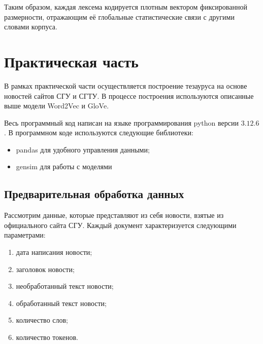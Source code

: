 \documentclass[coursework]{SCWorks}
\begin{document}
Таким образом, каждая лексема кодируется плотным вектором фиксированной размерности, отражающим её глобальные статистические связи с другими словами корпуса.






\section{Практическая часть}
В рамках практической части осуществляется построение тезауруса на основе новостей сайтов СГУ и СГТУ. В процессе построения используются описанные выше модели Word2Vec и GloVe.

Весь программный код написан на языке программирования python версии $3.12.6$. В программном коде используются следующие библиотеки:
\begin{itemize}
  \item pandas для удобного управления данными;
  \item gensim для работы с моделями
\end{itemize}
\subsection{Предварительная обработка данных}
Рассмотрим данные, которые представляют из себя новости, взятые из официального сайта СГУ. Каждый документ характеризуется следующими параметрами:
\begin{enumerate}
  \item дата написания новости;
  \item заголовок новости;
  \item необработанный текст новости;
  \item обработанный текст новости;
  \item количество слов;
  \item количество токенов.
\end{enumerate}
\end{document}
